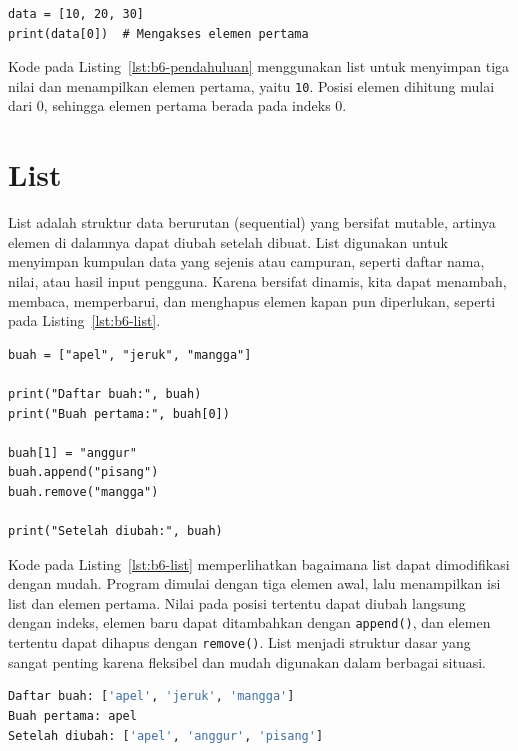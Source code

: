 \begin{lstlisting}[style=PythonStyle, caption={Contoh list sederhana}, label={lst:b6-pendahuluan}]
data = [10, 20, 30]
print(data[0])  # Mengakses elemen pertama
\end{lstlisting}
Kode pada Listing~\ref{lst:b6-pendahuluan} menggunakan list untuk menyimpan tiga nilai dan menampilkan elemen pertama, yaitu \texttt{10}. Posisi elemen dihitung mulai dari 0, sehingga elemen pertama berada pada indeks 0.

\section{List}
List adalah struktur data berurutan (sequential) yang bersifat mutable, artinya elemen di dalamnya dapat diubah setelah dibuat. 
List digunakan untuk menyimpan kumpulan data yang sejenis atau campuran, seperti daftar nama, nilai, atau hasil input pengguna. 
Karena bersifat dinamis, kita dapat menambah, membaca, memperbarui, dan menghapus elemen kapan pun diperlukan, seperti pada Listing~\ref{lst:b6-list}.

\begin{lstlisting}[style=PythonStyle, caption={Membaca dan mengubah isi list}, label={lst:b6-list}]
buah = ["apel", "jeruk", "mangga"]

print("Daftar buah:", buah)
print("Buah pertama:", buah[0])

buah[1] = "anggur"
buah.append("pisang")
buah.remove("mangga")

print("Setelah diubah:", buah)
\end{lstlisting}

Kode pada Listing~\ref{lst:b6-list} memperlihatkan bagaimana list dapat dimodifikasi dengan mudah. 
Program dimulai dengan tiga elemen awal, lalu menampilkan isi list dan elemen pertama. 
Nilai pada posisi tertentu dapat diubah langsung dengan indeks, elemen baru dapat ditambahkan dengan \texttt{append()}, 
dan elemen tertentu dapat dihapus dengan \texttt{remove()}. 
List menjadi struktur dasar yang sangat penting karena fleksibel dan mudah digunakan dalam berbagai situasi.

\begin{lstlisting}[language=bash, caption={Keluaran kode pengubahan list}, label={lst:b6-list-out}]
Daftar buah: ['apel', 'jeruk', 'mangga']
Buah pertama: apel
Setelah diubah: ['apel', 'anggur', 'pisang']
\end{lstlisting}


